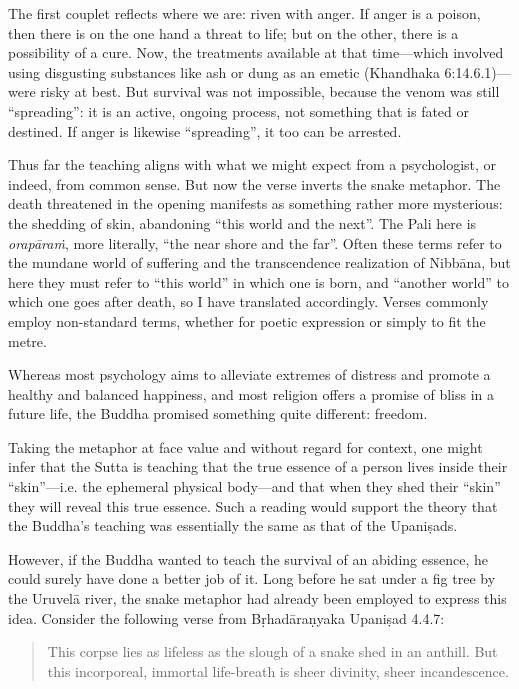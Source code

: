 \documentclass[12pt,openany]{book}%
\begin{document}
The first couplet reflects where we are: riven with anger. If anger is a poison, then there is on the one hand a threat to life; but on the other, there is a possibility of a cure. Now, the treatments available at that time—which involved using disgusting substances like ash or dung as an emetic (Khandhaka 6:14.6.1)—were risky at best. But survival was not impossible, because the venom was still “spreading”: it is an active, ongoing process, not something that is fated or destined. If anger is likewise “spreading”, it too can be arrested.

Thus far the teaching aligns with what we might expect from a psychologist, or indeed, from common sense. But now the verse inverts the snake metaphor. The death threatened in the opening manifests as something rather more mysterious: the shedding of skin, abandoning “this world and the next”. The Pali here is \textit{\textsanskrit{orapāraṁ}}, more literally, “the near shore and the far”. Often these terms refer to the mundane world of suffering and the transcendence realization of \textsanskrit{Nibbāna}, but here they must refer to “this world” in which one is born, and “another world” to which one goes after death, so I have translated accordingly. Verses commonly employ non-standard terms, whether for poetic expression or simply to fit the metre.

Whereas most psychology aims to alleviate extremes of distress and promote a healthy and balanced happiness, and most religion offers a promise of bliss in a future life, the Buddha promised something quite different: freedom.

Taking the metaphor at face value and without regard for context, one might infer that the Sutta is teaching that the true essence of a person lives inside their “skin”—i.e. the ephemeral physical body—and that when they shed their “skin” they will reveal this true essence. Such a reading would support the theory that the Buddha’s teaching was essentially the same as that of the \textsanskrit{Upaniṣads}.

However, if the Buddha wanted to teach the survival of an abiding essence, he could surely have done a better job of it. Long before he sat under a fig tree by the \textsanskrit{Uruvelā} river, the snake metaphor had already been employed to express this idea. Consider the following verse from \textsanskrit{Bṛhadāraṇyaka} \textsanskrit{Upaniṣad} 4.4.7:

\begin{quotation}%
This corpse lies as lifeless as the slough of a snake shed in an anthill. But this incorporeal, immortal life-breath is sheer divinity, sheer incandescence.

%
\end{quotation}
\end{document}
